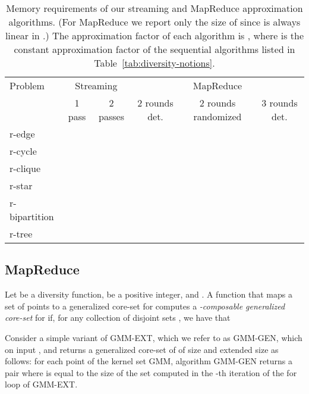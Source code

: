 \documentclass{article}
\begin{document}
\begin{table}
  \small
  \centering
  \begin{tabular}{l@{\hskip 2pt} | c@{\hskip 1pt} c@{\hskip 1pt} | c@{\hskip -1pt} c@{\hskip 0pt} c}
    \toprule
    Problem
     & \multicolumn{2}{c|}{Streaming}
     & \multicolumn{3}{c}{MapReduce}
    \\
& 1 pass
     & 2 passes
     & 2 rounds det.
     & 2 rounds randomized
     & 3 rounds det.
    \\
    \midrule
    r-edge 
     & \multirow{2}{*}{}
     & \multirow{2}{*}{}
     & \multirow{2}{*}{}
     & \multirow{2}{*}{}
     & \multirow{2}{*}{}
    \\
    r-cycle & & & & & \\
    \midrule
    r-clique 
     & \multirow{4}{*}{
       
       }
     & \multirow{4}{*}{
       
       }
     & \multirow{4}{*}{
       
       }
     & \multirow{4}{*}{
       
       }
     & \multirow{4}{*}{
       
       }
    \\
    r-star & & & & & \\
    r-bipartition & & & & & \\
    r-tree & & & & & \\
    \bottomrule
  \end{tabular}
  \caption{Memory requirements of our streaming and MapReduce approximation
    algorithms. (For MapReduce we report only the size of  since
     is always linear in .)  The approximation factor of each algorithm is ,
    where  is the constant approximation factor of the
    sequential algorithms listed in Table~\ref{tab:diversity-notions}.
    }\label{tab:mapreduce-streaming}
\end{table}

\subsection{MapReduce}
\label{sec:gen-mapreduce}
Let  be a diversity function,  be a positive
integer, and . A function  that maps a set of
points  to a generalized core-set  for  computes a
\emph{-composable generalized core-set} for  if,
for any collection of disjoint sets , we have that

Consider a simple variant of {\sc GMM-EXT}, which we refer to as {\sc
  GMM-GEN}, which on input ,  and  returns a generalized
core-set  of  of size  and extended size
 as follows: for each point  of the kernel set
 {\sc GMM}, algorithm {\sc GMM-GEN} returns a pair
 where  is equal to the size of the set 
computed in the -th iteration of the for loop of {\sc GMM-EXT}. 
\end{document}
